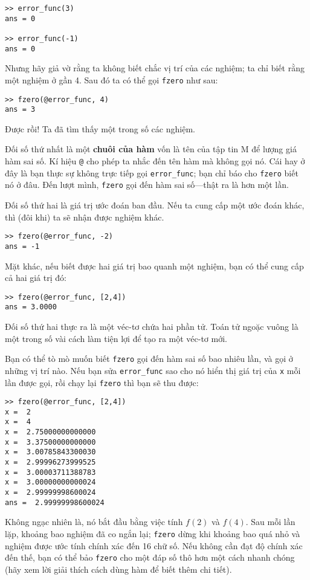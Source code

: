 \documentclass[12pt]{book}
\begin{document}
\begin{verbatim}
>> error_func(3)
ans = 0

>> error_func(-1)
ans = 0
\end{verbatim}
%
Nhưng hãy giả vờ rằng ta không biết chắc vị trí của các nghiệm;
ta chỉ biết rằng một nghiệm ở gần 4.  Sau đó ta có thể gọi 
{\tt fzero} như sau:

\begin{verbatim}
>> fzero(@error_func, 4)
ans = 3
\end{verbatim}
%
Được rồi! Ta đã tìm thấy một trong số các nghiệm.

Đối số thứ nhất là một {\bf chuôi của hàm} vốn là tên của 
tập tin M để lượng giá hàm sai số. Kí hiệu  {\tt @} cho phép
ta nhắc đến tên hàm mà không gọi nó. Cái hay ở đây là bạn
thực sự không trực tiếp gọi \verb#error_func#; bạn chỉ
báo cho {\tt fzero} biết nó ở đâu.  Đến lượt mình, {\tt fzero}
gọi đến hàm sai số---thật ra là hơn một lần.

Đối số thứ hai là giá trị ước đoán ban đầu. Nếu ta cung cấp 
một ước đoán khác, thì (đôi khi) ta sẽ nhận được nghiệm khác.

\begin{verbatim}
>> fzero(@error_func, -2)
ans = -1
\end{verbatim}
%
Mặt khác, nếu biết được hai giá trị bao quanh một nghiệm,
bạn có thể cung cấp cả hai giá trị đó:

\begin{verbatim}
>> fzero(@error_func, [2,4])
ans = 3.0000
\end{verbatim}
%
Đối số thứ hai thực ra là một véc-tơ chứa hai phần tử. Toán tử
ngoặc vuông là một trong số vài cách làm tiện lợi để tạo ra 
một véc-tơ mới.

Bạn có thể tò mò muốn biết {\tt fzero} gọi đến hàm sai số bao nhiêu
lần, và gọi ở những vị trí nào. Nếu bạn sửa \verb#error_func# 
sao cho nó hiển thị giá trị của {\tt x} mỗi lần được gọi, rồi chạy lại 
{\tt fzero} thì bạn sẽ thu được:

\begin{verbatim}
>> fzero(@error_func, [2,4])
x =  2
x =  4
x =  2.75000000000000
x =  3.37500000000000
x =  3.00785843300030
x =  2.99996273999525
x =  3.00003711388783
x =  3.00000000000024
x =  2.99999998600024
ans =  2.99999998600024
\end{verbatim}
%
Không ngạc nhiên là, nó bắt đầu bằng việc tính $f(2)$ và $f(4)$. 
Sau mỗi lần lặp, khoảng bao nghiệm đã co ngắn lại; {\tt fzero} 
dừng khi khoảng bao quá nhỏ và nghiệm được ước tính chính xác
đến 16 chữ số. Nếu không cần đạt độ chính xác đến thế, bạn
có thể bảo {\tt fzero} cho một đáp số thô hơn một cách nhanh
chóng (hãy xem lời giải thích cách dùng hàm để biết thêm chi tiết).
\end{document}
